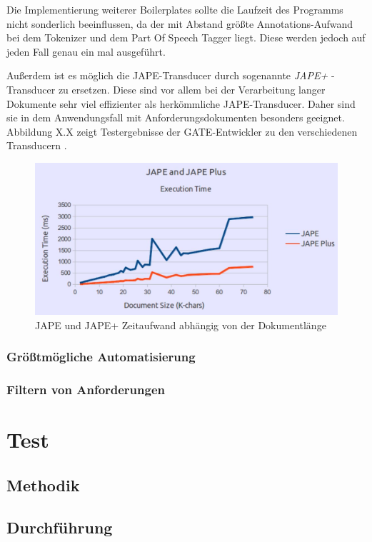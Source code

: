 \documentclass[12pt]{report}
\begin{document}
Die Implementierung weiterer Boilerplates sollte die Laufzeit des Programms nicht sonderlich beeinflussen, da der mit Abstand größte Annotations-Aufwand bei dem Tokenizer und dem Part Of Speech Tagger liegt. Diese werden jedoch auf jeden Fall genau ein mal ausgeführt. 

Außerdem ist es möglich die JAPE-Transducer durch sogenannte \textit{JAPE+} -Transducer zu ersetzen. Diese sind vor allem bei der Verarbeitung langer Dokumente sehr viel effizienter als herkömmliche JAPE-Transducer. Daher sind sie in dem Anwendungsfall mit Anforderungsdokumenten besonders geeignet. Abbildung X.X zeigt Testergebnisse der GATE-Entwickler zu den verschiedenen Transducern \cite{gm19}.

\begin{figure}[H]
\begin{center}
\includegraphics[scale=0.7]{Bilder/TransducerTest.jpg}
\caption{JAPE und JAPE+ Zeitaufwand abhängig von der Dokumentlänge}
\end{center}
\end{figure}


\subsubsection{Größtmögliche Automatisierung}
\subsubsection{Filtern von Anforderungen}
\section{Test}
\subsection{Methodik}
\subsection{Durchführung}
\end{document}
